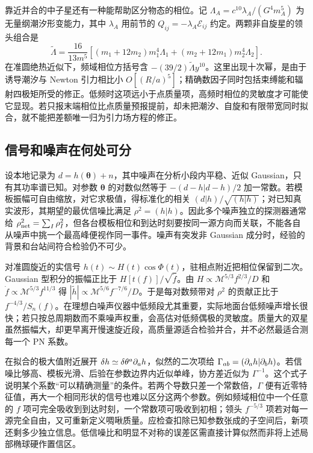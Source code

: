 靠近并合的中子星还有一种能帮助区分物态的相位。记 $\Lambda_A=c^{10}\lambda_A/(G^4m_A^5)$ 为无量纲潮汐形变能力，其中 $\lambda_A$ 用前节的 $Q_{ij}=-\lambda_A\mathcal E_{ij}$ 约定。两颗非自旋星的领头组合是
\[
 \widetilde\Lambda=\frac{16}{13m^5}
 \left[(m_1+12m_2)m_1^4\Lambda_1+
       (m_2+12m_1)m_2^4\Lambda_2\right].
\]
在准圆绝热近似下，频域相位方括号含 $-(39/2)\widetilde\Lambda y^{10}$。这里出现十次幂，是由于诱导潮汐与 Newton 引力相比小 $O[(R/a)^5]$；精确数因子同时包括束缚能和辐射四极矩所受的修正。低频时这项远小于点质量项，高频时相位的灵敏度才可能使它显现。若只报末端相位比点质量预报提前，却未把潮汐、自旋和有限带宽同时拟合，就不能把差额唯一归为引力场方程的修正。

\subsection{信号和噪声在何处可分}

设本地记录为 $d=h(\bm\theta)+n$，其中噪声在分析小段内平稳、近似 Gaussian，只有其功率谱已知。对参数 $\bm\theta$ 的对数似然等于 $-(d-h|d-h)/2$ 加一常数。若模板振幅可自由缩放，对它求极值，得标准化的相关 $(d|h)/\sqrt{(h|h)}$；对已知真实波形，其期望的最优信噪比满足 $\rho^2=(h|h)$。因此多个噪声独立的探测器通常给 $\rho_{\rm net}^2=\sum_I\rho_I^2$，但各台模板相位和到达时刻要按同一源方向而关联，不能各自从噪声中挑一个最高峰便视作同一事件。噪声有突发非 Gaussian 成分时，经验的背景和台站间符合检验仍不可少。

对准圆旋近的实信号 $h(t)\sim H(t)\cos\Phi(t)$，驻相点附近把相位保留到二次。Gaussian 型积分的振幅正比于 $H[t(f)]/\sqrt{\dot f}$。由 $H\propto\mathcal M^{5/3}f^{2/3}/D$ 和 $\dot f\propto\mathcal M^{5/3} f^{11/3}$ 得 $|\tilde h|\propto\mathcal M^{5/6}f^{-7/6}/D$。于是每对数频带对 $\rho^2$ 的贡献正比于 $f^{-4/3}/S_n(f)$。在理想白噪声仪器中低频段尤其重要，实际地面台低频噪声增长很快；若只按总周期数而不乘噪声权重，会高估对低频偶极的灵敏度。质量大的双星虽然振幅大，却更早离开慢速旋近段，高质量源适合检验并合，并不必然最适合测每一个 PN 系数。

在拟合的极大值附近展开 $\delta h\simeq\delta\theta^a\partial_a h$，似然的二次项给 $\Gamma_{ab}=(\partial_a h|\partial_b h)$。若信噪比够高、模板光滑、后验在参数边界内近似单峰，协方差近似为 $\Gamma^{-1}$。这个式子说明某个系数“可以精确测量”的条件。若两个导数只差一个常数倍，$\Gamma$ 便有近零特征值，再大一个相同形状的信号也难以区分这两个参数。例如频域相位中一个任意的 $f$ 项可完全吸收到到达时刻，一个常数项可吸收到初相；领头 $f^{-5/3}$ 项若对每一源完全自由，又可重新定义啁啾质量。应检查扣除已知参数张成的子空间后，新项还剩多少独立信息。低信噪比和明显不对称的误差区需直接计算似然而非将上述局部椭球硬作置信区。

